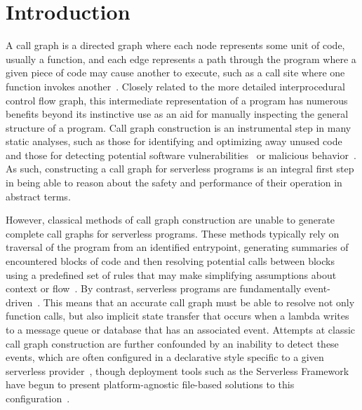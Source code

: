 \section{Introduction}

A call graph is a directed graph where each node represents some unit of code, usually a function, and each edge represents a path through the program where a given piece of code may cause another to execute, such as a call site where one function invokes another~\cite{introcallgraph}. Closely related to the more detailed interprocedural control flow graph, this intermediate representation of a program has numerous benefits beyond its instinctive use as an aid for manually inspecting the general structure of a program. Call graph construction is an instrumental step in many static analyses, such as those for identifying and optimizing away unused code~\cite{deadcode} and those for detecting potential software vulnerabilities~\cite{vulns} or malicious behavior~\cite{malicious}. As such, constructing a call graph for serverless programs is an integral first step in being able to reason about the safety and performance of their operation in abstract terms. \par

However, classical methods of call graph construction are unable to generate complete call graphs for serverless programs. These methods typically rely on traversal of the program from an identified entrypoint, generating summaries of encountered blocks of code and then resolving potential calls between blocks using a predefined set of rules that may make simplifying assumptions about context or flow~\cite{partialcallgraph}. By contrast, serverless programs are fundamentally event-driven~\cite{serverlessoverview}. This means that an accurate call graph must be able to resolve not only function calls, but also implicit state transfer that occurs when a lambda writes to a message queue or database that has an associated event. Attempts at classic call graph construction are further confounded by an inability to detect these events, which are often configured in a declarative style specific to a given serverless provider~\cite{frameworkoverview}, though deployment tools such as the Serverless Framework have begun to present platform-agnostic file-based solutions to this configuration~\cite{serverlessframework}. \par


